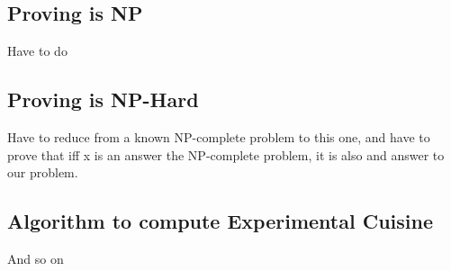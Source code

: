 \documentclass[a4paper,10pt]{article}
\begin{document}
\subsection{Proving is NP}
Have to do

\subsection{Proving is NP-Hard}
Have to reduce from a known NP-complete problem to this one, and have to prove that iff x is an answer the NP-complete problem, it is also and answer to our problem.

\subsection{Algorithm to compute Experimental Cuisine}
And so on
\end{document}
